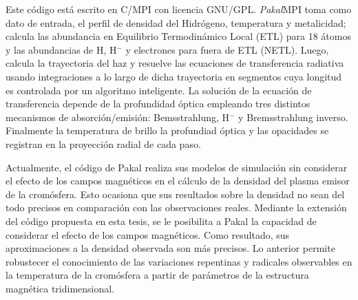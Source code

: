Este c\'odigo est\'a escrito en C/MPI con licencia GNU/GPL. \emph{Pakal}MPI toma como dato de entrada, el perfil de densidad del Hidr\'ogeno, temperatura y metalicidad; calcula las abundancia en Equilibrio Termodin\'amico  Local (ETL) para 18 \'atomos y las abundancias de H, H$^{-}$ y electrones para fuera de ETL (NETL). Luego, calcula la trayectoria del haz y resuelve las ecuaciones de transferencia radiativa usando integraciones a lo largo de dicha trayectoria en segmentos cuya longitud es controlada por un algoritmo inteligente. La soluci\'on de la ecuaci\'on de transferencia depende de la profundidad \'optica empleando tres distintos mecanismos de absorci\'on/emisi\'on: Bemsstrahlung, H$^{-}$ y Bremsstrahlung inverso. Finalmente la temperatura de brillo la profundiad \'optica y las opacidades se registran en la proyecci\'on radial de cada paso.

Actualmente, el c\'odigo de Pakal realiza sus modelos de simulaci\'on sin considerar el efecto de los campos magn\'eticos en el c\'alculo de la densidad del plasma emisor de la crom\'osfera. Esto ocasiona que sus resultados sobre la densidad no sean del todo precisos en comparaci\'on con las observaciones reales. Mediante la extensi\'on del c\'odigo propuesta en esta tesis, se le posibilita a Pakal la capacidad de considerar el efecto de los campos magn\'eticos. Como resultado, sus aproximaciones a la densidad observada son m\'as precisos. Lo anterior permite robustecer el conocimiento de las variaciones repentinas y radicales observables en la temperatura de la crom\'osfera a partir de par\'ametros de la estructura magn\'etica tridimensional.
